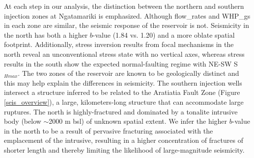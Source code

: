 At each step in our analysis, the distinction between the northern and southern injection zones at Ngatamariki is emphasized. Although \glspl{flow_rate} and \glspl{WHP_g} in each zone are similar, the seismic response of the reservoir is not. Seismicity in the north has both a higher $b$-value (1.84 vs. 1.20) and a more oblate spatial footprint. Additionally, stress inversion results from focal mechanisms in the north reveal an unconventional stress state with no vertical axes, whereas stress results in the south show the expected normal-faulting regime with NE-SW S$_{Hmax}$. The two zones of the reservoir are known to be geologically distinct \citep{Bignall_2009,Chambefort_2014} and this may help explain the differences in seismicity. The southern injection wells intersect a structure inferred to be related to the Aratiatia Fault Zone (Figure \ref{seis_overview}), a large, kilometers-long structure that can accommodate large ruptures. The north is highly-fractured and dominated by a tonalite intrusive body (below $\sim$2000 m bsl) of unknown spatial extent. We infer the higher $b$-value in the north to be a result of pervasive fracturing associated with the emplacement of the intrusive, resulting in a higher concentration of fractures of shorter length and thereby limiting the likelihood of large-magnitude seismicity.

